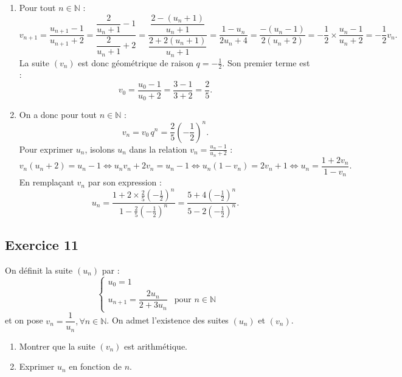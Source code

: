 \documentclass[11pt,a4paper]{article}
\newcommand{\N}{\mathbb{N}}
\begin{document}
\begin{correctionbox}
\begin{enumerate}
    \item Pour tout $n \in \N$ :
    \[
    v_{n+1} = \frac{u_{n+1} - 1}{u_{n+1} + 2} = \frac{\dfrac{2}{u_n+1} - 1}{\dfrac{2}{u_n+1} + 2} = \frac{\dfrac{2 - (u_n+1)}{u_n+1}}{\dfrac{2 + 2(u_n+1)}{u_n+1}} = \frac{1 - u_n}{2u_n + 4} = \frac{-(u_n - 1)}{2(u_n + 2)} = -\frac{1}{2} \times \frac{u_n - 1}{u_n + 2} = -\frac{1}{2} v_n.
    \]
    La suite $(v_n)$ est donc géométrique de raison $q = -\frac{1}{2}$. Son premier terme est :
    \[
    v_0 = \frac{u_0 - 1}{u_0 + 2} = \frac{3 - 1}{3 + 2} = \frac{2}{5}.
    \]
    \item On a donc pour tout $n \in \N$ :
    \[
    v_n = v_0 \, q^n = \frac{2}{5} \left(-\frac{1}{2}\right)^n.
    \]
    Pour exprimer $u_n$, isolons $u_n$ dans la relation $v_n = \frac{u_n - 1}{u_n + 2}$ :
    \[
    v_n (u_n + 2) = u_n - 1 \iff u_n v_n + 2v_n = u_n - 1 \iff u_n(1 - v_n) = 2v_n + 1 \iff u_n = \frac{1 + 2v_n}{1 - v_n}.
    \]
    En remplaçant $v_n$ par son expression :
    \[
    u_n = \frac{1 + 2 \times \frac{2}{5}\left(-\frac{1}{2}\right)^n}{1 - \frac{2}{5}\left(-\frac{1}{2}\right)^n} = \frac{5 + 4\left(-\frac{1}{2}\right)^n}{5 - 2\left(-\frac{1}{2}\right)^n}.
    \]
\end{enumerate}
\end{correctionbox}

\subsection*{Exercice 11}
On définit la suite $(u_n)$ par :
\[
\begin{cases}
u_0 = 1\\
u_{n+1} = \dfrac{2u_n}{2 + 3u_n} & \text{pour } n \in \N
\end{cases}
\]
et on pose $v_n = \dfrac{1}{u_n}, \forall n \in \N$. On admet l'existence des suites $(u_n)$ et $(v_n)$.
\begin{enumerate}
    \item Montrer que la suite $(v_n)$ est arithmétique.
    \item Exprimer $u_n$ en fonction de $n$.
\end{enumerate}
\end{document}
